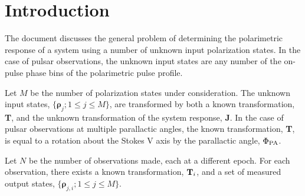 \documentclass[12pt]{article}
\newcommand{\para}[1][ ]{\ensuremath{ {\Phi}_{{\rm PA}{#1}} }}
\newcommand{\obs}{\ensuremath{ {\bm\rho}_{j,i} }}
\begin{document}
\section{Introduction}

The document discusses the general problem of determining the
polarimetric response of a system using a number of unknown input
polarization states.  In the case of pulsar observations, the unknown
input states are any number of the on-pulse phase bins of the
polarimetric pulse profile.

Let $M$ be the number of polarization states under consideration.  The
unknown input states, $\{\bm\rho_j; 1\le j\le M\}$, are transformed by
both a known transformation, {\bf T}, and the unknown transformation
of the system response, {\bf J}.  In the case of pulsar observations
at multiple parallactic angles, the known transformation, {\bf T}, is
equal to a rotation about the Stokes V axis by the parallactic angle,
\para.

Let $N$ be the number of observations made, each at a different epoch.
For each observation, there exists a known transformation, ${\bf
T}_i$, and a set of measured output states, $\{\obs; 1\le j\le M\}$.
\end{document}
